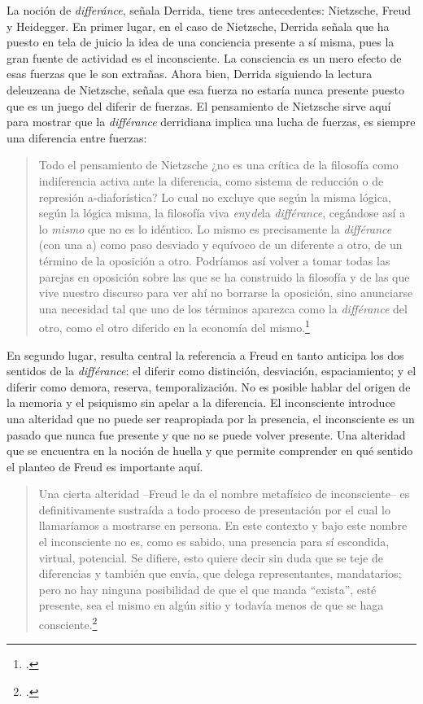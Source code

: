 La noción de \emph{differánce}, señala Derrida, tiene tres antecedentes:
Nietzsche, Freud y Heidegger. En primer lugar, en el caso de Nietzsche,
Derrida señala que ha puesto en tela de juicio la idea de una conciencia
presente a sí misma, pues la gran fuente de actividad es el
inconsciente. La consciencia es un mero efecto de esas fuerzas que le
son extrañas. Ahora bien, Derrida siguiendo la lectura deleuzeana de
Nietzsche, señala que esa fuerza no estaría nunca presente puesto que es
un juego del diferir de fuerzas. El pensamiento de Nietzsche sirve aquí
para mostrar que la \emph{différance} derridiana implica una lucha de
fuerzas, es siempre una diferencia entre fuerzas:

\begin{quote}
Todo el pensamiento de Nietzsche ¿no es una crítica de la filosofía como
indiferencia activa ante la diferencia, como sistema de reducción o de
represión a-diaforística? Lo cual no excluye que según la misma lógica,
según la lógica misma, la filosofía viva \emph{en}y\emph{de}la
\emph{différance}, cegándose así a lo \emph{mismo} que no es lo
idéntico. Lo mismo es precisamente la \emph{différance} (con una a) como
paso desviado y equívoco de un diferente a otro, de un término de la
oposición a otro. Podríamos así volver a tomar todas las parejas en
oposición sobre las que se ha construido la filosofía y de las que vive
nuestro discurso para ver ahí no borrarse la oposición, sino anunciarse
una necesidad tal que uno de los términos aparezca como la
\emph{différance} del otro, como el otro diferido en la economía del
mismo.\footcite[18]{derrida1989a}
\end{quote}

En segundo lugar, resulta central la referencia a Freud en tanto
anticipa los dos sentidos de la \emph{différance}: el diferir como
distinción, desviación, espaciamiento; y el diferir como demora,
reserva, temporalización. No es posible hablar del origen de la memoria
y el psiquismo sin apelar a la diferencia. El inconsciente introduce una
alteridad que no puede ser reapropiada por la presencia, el inconsciente
es un pasado que nunca fue presente y que no se puede volver presente.
Una alteridad que se encuentra en la noción de huella y que permite
comprender en qué sentido el planteo de Freud es importante aquí.

\begin{quote}
Una cierta alteridad --Freud le da el nombre metafísico de
inconsciente-- es definitivamente sustraída a todo proceso de
presentación por el cual lo llamaríamos a mostrarse en persona. En este
contexto y bajo este nombre el inconsciente no es, como es sabido, una
presencia para sí escondida, virtual, potencial. Se difiere, esto quiere
decir sin duda que se teje de diferencias y también que envía, que
delega representantes, mandatarios; pero no hay ninguna posibilidad de
que el que manda \enquote{exista}, esté presente, sea el mismo en algún sitio
y todavía menos de que se haga consciente.\footcite[21]{derrida1989a}
\end{quote}

